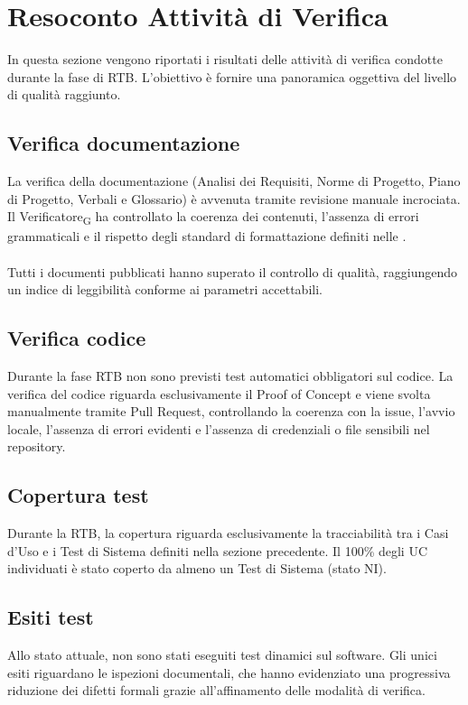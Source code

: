 \section{Resoconto Attività di Verifica}
In questa sezione vengono riportati i risultati delle attività di verifica condotte durante la fase di RTB. L'obiettivo è fornire una panoramica oggettiva del livello di qualità raggiunto.

\subsection{Verifica documentazione}
La verifica della documentazione (Analisi dei Requisiti, Norme di Progetto, Piano di Progetto, Verbali e Glossario) è avvenuta tramite revisione manuale incrociata. Il Verificatore\textsubscript{G} ha controllato la coerenza dei contenuti, l'assenza di errori grammaticali e il rispetto degli standard di formattazione definiti nelle .
\\ \\
Tutti i documenti pubblicati hanno superato il controllo di qualità, raggiungendo un indice di leggibilità conforme ai parametri accettabili.

\subsection{Verifica codice}
Durante la fase RTB non sono previsti test automatici obbligatori sul codice. La verifica del codice riguarda esclusivamente il Proof of Concept e viene svolta manualmente tramite Pull Request, controllando la coerenza con la issue, l'avvio locale, l'assenza di errori evidenti e l'assenza di credenziali o file sensibili nel repository.

\subsection{Copertura test}
Durante la RTB, la copertura riguarda esclusivamente la tracciabilità tra i Casi d'Uso e i Test di Sistema definiti nella sezione precedente. Il 100\% degli UC individuati è stato coperto da almeno un Test di Sistema (stato NI).

\subsection{Esiti test}
Allo stato attuale, non sono stati eseguiti test dinamici sul software. Gli unici esiti riguardano le ispezioni documentali, che hanno evidenziato una progressiva riduzione dei difetti formali grazie all'affinamento delle modalità di verifica.

